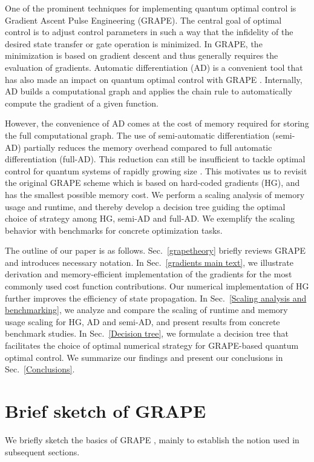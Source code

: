 \documentclass[letterpaper,10pt]{iopart}
\begin{document}
One of the prominent techniques for implementing quantum optimal control is Gradient Ascent Pulse Engineering (GRAPE). The central goal of optimal control is to adjust control parameters in such a way that the infidelity of the desired state transfer or gate operation is minimized. In GRAPE, the minimization is based on gradient descent and thus generally requires the evaluation of gradients. Automatic differentiation (AD) \cite{baydin2018automatic} is a convenient tool that has also made an impact on quantum optimal control with GRAPE \cite{pacleung2017speedup,pacqoc,abdelhafez2019gradient,grapead}.
Internally, AD builds a computational graph and applies the chain rule to automatically compute the gradient of a given function. 

However, the convenience of AD comes at the cost of memory required for storing the full computational graph. The use of semi-automatic differentiation (semi-AD) \cite{semiadgoerz2022quantum} partially reduces the memory overhead compared to full automatic differentiation (full-AD). This reduction can still be insufficient to tackle optimal control for quantum systems of rapidly growing size \cite{arute2019quantum,gong2021quantum}. This motivates us to revisit the original GRAPE scheme \cite{nmrkhaneja2005optimal} which is based on hard-coded gradients (HG), and has the smallest possible memory cost. We perform a scaling analysis of memory usage and runtime, and thereby develop a decision tree guiding the optimal choice of strategy among HG, semi-AD and full-AD. We exemplify the scaling behavior with benchmarks for concrete optimization tasks.

The outline of our paper is as follows. Sec.\ \ref{grapetheory} briefly reviews GRAPE and introduces necessary notation. In Sec.\ \ref{gradients main text}, we illustrate derivation and memory-efficient implementation of the gradients for the most commonly used cost function contributions. Our numerical implementation of HG further improves the efficiency of state propagation. In Sec.\ \ref{Scaling analysis and benchmarking}, we analyze and compare the scaling of runtime and memory usage scaling for HG, AD and semi-AD, and present results from concrete benchmark studies. In Sec.\ \ref{Decision tree}, we formulate a decision tree that facilitates the choice of optimal numerical strategy for GRAPE-based quantum optimal control. We summarize our findings and present our conclusions in Sec.\ \ref{Conclusions}.

\section{Brief sketch of GRAPE \label{grapetheory}}
We briefly sketch the basics of GRAPE \cite{nmrkhaneja2005optimal}, mainly to establish the notion used in subsequent sections. 
\end{document}
